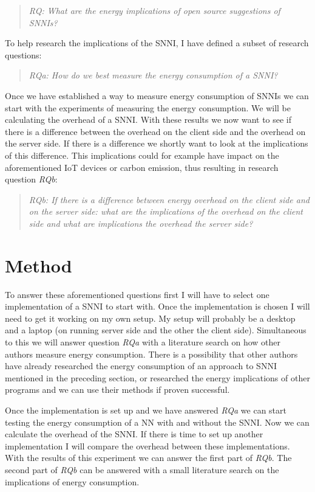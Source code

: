 \documentclass{uva-inf-article}
\begin{document}
\begin{quote} \emph{RQ: What are the energy implications of open source suggestions of SNNIs?} \end{quote} 

\noindent To help research the implications of the SNNI, I have defined a subset of research questions:

\begin{quote} \emph{RQa: How do we best measure the energy consumption of a SNNI?} \end{quote}

\noindent Once we have established a way to measure energy consumption of SNNIs we can start with the experiments of measuring the energy consumption. We will be calculating the overhead of a SNNI. With these results we now want to see if there is a difference between the overhead on the client side and the overhead on the server side. If there is a difference we shortly want to look at the implications of this difference. This implications could for example have impact on the aforementioned IoT devices or carbon emission, thus resulting in research question \textit{RQb}:

\begin{quote} \emph{RQb: If there is a difference between energy overhead on the client side and on the server side: what are the implications of the overhead on the client side and what are implications the overhead the server side?} \end{quote}

\section{Method}
To answer these aforementioned questions first I will have to select one implementation of a SNNI to start with. Once the implementation is chosen I will need to get it working on my own setup. My setup will probably be a desktop and a laptop (on running server side and the other the client side). Simultaneous to this we will answer question \textit{RQa} with a literature search on how other authors measure energy consumption. There is a possibility that other authors have already researched the energy consumption of an approach to SNNI mentioned in the preceding section, or researched the energy implications of other programs and we can use their methods if proven successful.

Once the implementation is set up and we have answered \textit{RQa} we can start testing the energy consumption of a NN with and without the SNNI. Now we can calculate the overhead of the SNNI. If there is time to set up another implementation I will compare the overhead between these implementations. With the results of this experiment we can answer the first part of \textit{RQb}. The second part of \textit{RQb} can be answered with a small literature search on the implications of energy consumption. 
\end{document}
